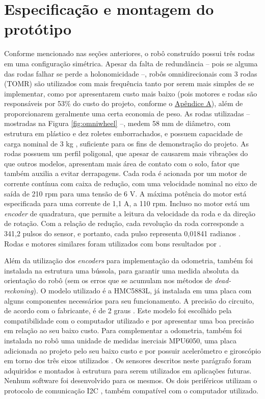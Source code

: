 

\section{Especificação e montagem do protótipo}
\label{sec:montagem}

Conforme mencionado nas seções anteriores, o robô construído possui três rodas em uma configuração simétrica. Apesar da falta de redundância -- pois se alguma das rodas falhar se perde a holonomicidade --, robôs omnidirecionais com 3 rodas (TOMR) são utilizados com mais frequência tanto por serem mais simples de se implementar, como por apresentarem custo mais baixo (pois motores e rodas são responsáveis por 53\% do custo do projeto, conforme o \hyperref[sec:custo]{Apêndice A}), além de proporcionarem geralmente uma certa economia de peso. As rodas utilizadas -- mostradas na Figura \ref{fig:omniwheel} --, medem 58 mm de diâmetro, com estrutura em plástico e dez roletes emborrachados, e possuem capacidade de carga nominal de 3 kg \citep{omniwheel}, suficiente para os fins de demonstração do projeto. As rodas possuem um perfil poligonal, que apesar de causarem mais vibrações do que outros modelos, apresentam mais área de contato com o solo, fator que também auxilia a evitar derrapagens. Cada roda é acionada por um motor de corrente contínua com caixa de redução, com uma velocidade nominal no eixo de saída de 210 rpm para uma tensão de 6 V. A máxima potência do motor está especificada para uma corrente de 1,1 A, a 110 rpm. Incluso no motor está um \textit{encoder} de quadratura, que permite a leitura da velocidade da roda e da direção de rotação. Com a relação de redução, cada revolução da roda corresponde a 341,2 pulsos do sensor, e portanto, cada pulso representa 0,01841 radianos \citep{motor}. Rodas e motores similares foram utilizados com bons resultados por \citet{samani2007comprehensive}.

Além da utilização dos \textit{encoders} para implementação da odometria, também foi instalada na estrutura uma bússola, para garantir uma medida absoluta da orientação do robô (sem os erros que se acumulam nos métodos de \textit{dead-reckoning}). O modelo utilizado é a HMC5883L, já instalada em uma placa com alguns componentes necessários para seu funcionamento. A precisão do circuito, de acordo com o fabricante, é de 2 graus \citep{HMC5883L}. Este modelo foi escolhido pela compatibilidade com o computador utilizado e por apresentar uma boa precisão em relação ao seu baixo custo. Para complementar a odometria, também foi instalada no robô uma unidade de medidas inerciais MPU6050, uma placa adicionada ao projeto pelo seu baixo custo e por possuir acelerômetro e giroscópio em torno dos três eixos utilizados \citep{MPU6050}. Os sensores descritos neste parágrafo foram adquiridos e montados à estrutura para serem utilizados em aplicações futuras. Nenhum software foi desenvolvido para os mesmos. Os dois periféricos utilizam o protocolo de comunicação I2C \citep{semiconductors2000i2c}, também compatível com o computador utilizado.


